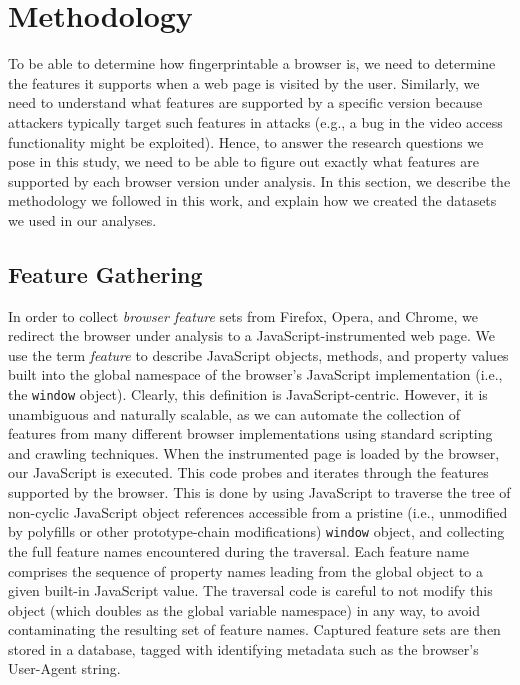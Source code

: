 \section{Methodology}
\label{sec:methodology}

To be able to determine how fingerprintable a browser is, we need to
determine the features it supports when a web page is visited by the
user. Similarly, we need to understand what features are supported by
a specific version because attackers typically target such features in
attacks (e.g., a bug in the video access functionality might be
exploited). Hence, to answer the research questions we pose in this
study, we need to be able to figure out exactly what features are
supported by each browser version under analysis. In this section, we
describe the methodology we followed in this work, and explain how we
created the datasets we used in our analyses.

\subsection{Feature Gathering}
\label{sec:feature-gathering}

In order to collect \textit{browser feature} sets from Firefox, Opera, and
Chrome, we redirect the browser under analysis to a
JavaScript-instrumented web page. We use the term \textit{feature} to
describe JavaScript objects, methods, and property values built into the
global namespace of the browser's JavaScript implementation (i.e., the
\texttt{window} object).  Clearly, this definition is
JavaScript-centric. However, it is unambiguous and naturally scalable,
as we can automate the collection of features from many different
browser implementations using standard scripting and crawling
techniques. When the instrumented page is loaded by the browser, our
JavaScript is executed.  This code probes and iterates through the
features supported by the browser. This is done by using JavaScript to
traverse the tree of non-cyclic JavaScript object references accessible
from a pristine (i.e., unmodified by polyfills or other prototype-chain
modifications) \texttt{window} object, and collecting the full feature
names encountered during the traversal. Each feature name comprises the
sequence of property names leading from the global object to a given
built-in JavaScript value. The traversal code is careful to not modify
this object (which doubles as the global variable namespace) in any way,
to avoid contaminating the resulting set of feature names. Captured
feature sets are then stored in a database, tagged with identifying
metadata such as the browser's User-Agent string.

